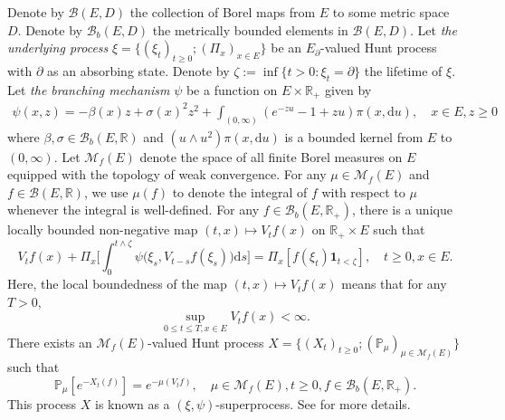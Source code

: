 \documentclass[12pt,a4paper]{amsart}
\numberwithin{equation}{section}
\theoremstyle{plain}
\theoremstyle{definition}
\theoremstyle{remark}
\begin{document}
	Denote by $\mathcal B(E, D)$ the collection of Borel maps  from $E$ to some metric space $D$.
	Denote by $\mathcal B_b(E,D)$ the metrically bounded elements in $\mathcal B(E,D)$.  
	Let \emph{the underlying process} $\xi = \{(\xi_t)_{t\ge0}; (\Pi_x)_{x\in E}\}$ be an $E_\partial$-valued Hunt process with $\partial$ as an absorbing state. 
	Denote by $\zeta:=\inf\{t>0: \xi_t=\partial\}$ the lifetime of $\xi$. 
	Let \emph{the branching mechanism} $\psi$ be a function on $E \times \mathbb R_+$ given by 
\begin{align}
	\psi(x,z)
	= -\beta(x) z + \sigma(x)^2 z^2 + \int_{(0,\infty)} (e^{-zu} -1 + zu) \pi(x,{\mathrm d}u), 
	\quad x\in E, z\geq 0
\end{align}
	where $\beta, \sigma \in \mathcal B_b(E,\mathbb R)$ and $(u \wedge u^2) \pi(x,{\mathrm d}u)$ is a bounded kernel from $E$ to $(0,\infty)$.
	Let $\mathcal M_f(E)$ denote the space of all finite Borel measures on $E$ equipped with the topology of weak convergence.
	For any $\mu \in \mathcal M_f(E)$ and $f\in \mathcal B(E,\mathbb R)$, we use $\mu(f)$ to denote the integral of $f$ with respect to $\mu$ whenever the integral is well-defined. 
	For any $f \in \mathcal B_b(E,\mathbb R_+)$, there is a unique locally bounded non-negative map $(t,x)\mapsto V_tf(x)$ on $\mathbb R_+\times E$ such that 
\begin{equation} \label{eq:M.1}
	V_tf(x) + \Pi_x\Big[\int_0^{t\wedge \zeta} \psi\big(\xi_s, V_{t-s} f(\xi_s)\big) {\mathrm d}s\Big] = \Pi_x[f(\xi_t) \mathbf 1_{t< \zeta}], \quad t\geq 0, x\in E. 
\end{equation}
	Here, the local boundedness of the map $(t,x) \mapsto V_tf(x)$ means that  for any $T>0$, 
\[ 
	\sup_{0\leq t\leq T, x\in E} V_tf(x) < \infty.
\] 
	There exists an $\mathcal M_f(E)$-valued Hunt process $X =\{(X_t)_{t\geq 0}; (\mathbb P_\mu)_{\mu \in \mathcal M_f(E)}\}$ such that 
\begin{equation}
	\mathbb P_\mu[e^{- X_t(f)}]
	= e^{- \mu(V_tf)},
	\quad \mu\in \mathcal M_f(E), t\geq 0, f \in \mathcal B_b(E,\mathbb R_+). 
\end{equation}
	This process $X$ is known as a $(\xi, \psi)$-superprocess. 
	See \cite[Section 2.3 and Theorem 5.11]{Li2011Measure-valued} for more details.
\end{document}
